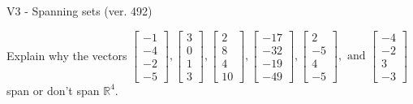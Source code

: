 \begin{exercise}
  \begin{exerciseTitle}V3 - Spanning sets (ver. 492)\end{exerciseTitle}
  \begin{exerciseStatement}
    Explain why the vectors \(\left[\begin{array}{r}
-1 \\
-4 \\
-2 \\
-5
\end{array}\right] , \left[\begin{array}{r}
3 \\
0 \\
1 \\
3
\end{array}\right] , \left[\begin{array}{r}
2 \\
8 \\
4 \\
10
\end{array}\right] , \left[\begin{array}{r}
-17 \\
-32 \\
-19 \\
-49
\end{array}\right] , \left[\begin{array}{r}
2 \\
-5 \\
4 \\
-5
\end{array}\right] , \text{ and } \left[\begin{array}{r}
-4 \\
-2 \\
3 \\
-3
\end{array}\right]\) span or don't span \(\mathbb{R}^4\). 
	



\end{exerciseStatement}
\end{exercise}
